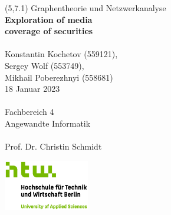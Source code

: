 \begin{titlepage}

\begingroup
\begin{textblock}{6}(5,7.1)
\setlength{\parindent}{0pt}
\fontsize{10pt}{1.1em}\selectfont
Graphentheorie und Netzwerkanalyse
\vspace{0.1cm}
\\
\LARGE
{\color{htwgreen}
\textbf{Exploration of media \\ coverage of securities}
}\\\\
\fontsize{10pt}{1.1em}\selectfont
Konstantin Kochetov (559121),\\
Sergey Wolf (553749),\\
Mikhail Poberezhnyi (558681)
\\
18 Januar 2023\\\\
Fachbereich 4\\
Angewandte Informatik\\\\
Prof. Dr. Christin Schmidt\\
\end{textblock}
\endgroup
     
\vfill
        
\begin{center}
\includegraphics[width=0.28\textwidth,keepaspectratio]{images/HTW_Logo_rgb.jpg}
\end{center}

\end{titlepage}
